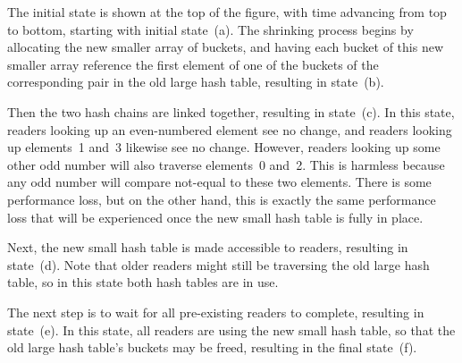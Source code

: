 The initial state is shown at the top of the figure, with time advancing
from top to bottom, starting with initial state~(a).
The shrinking process begins by allocating the new smaller array of
buckets, and having each bucket of this new smaller array reference
the first element of one of the buckets of the corresponding pair in
the old large hash table, resulting in state~(b).

Then the two hash chains are linked together, resulting in state~(c).
In this state, readers looking up an even-numbered element see no change,
and readers looking up elements~1 and~3 likewise see no change.
However, readers looking up some other odd number will also traverse
elements~0 and~2.
This is harmless because any odd number will compare not-equal to these
two elements.
There is some performance loss, but on the other hand, this is exactly
the same performance loss that will be experienced once the new small
hash table is fully in place.

Next, the new small hash table is made accessible to readers, resulting
in state~(d).
Note that older readers might still be traversing the old large hash
table, so in this state both hash tables are in use.

The next step is to wait for all pre-existing readers to complete,
resulting in state~(e).
In this state, all readers are using the new small hash table, so that
the old large hash table's buckets may be freed, resulting in the final
state~(f).

